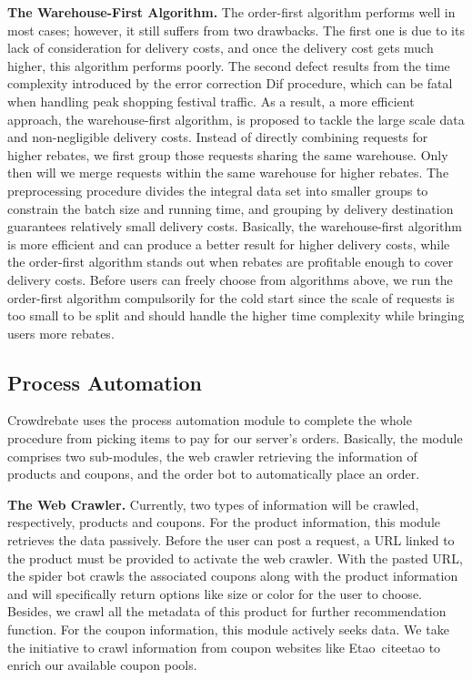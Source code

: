 \textbf{The Warehouse-First Algorithm.} The order-first algorithm performs well in most cases; however, it still suffers from two drawbacks. The first one is due to its lack of consideration for delivery costs, and once the delivery cost gets much higher, this algorithm performs poorly. The second defect results from the time complexity introduced by the error correction Dif procedure, which can be fatal when handling peak shopping festival traffic. As a result, a more efficient approach, the warehouse-first algorithm, is proposed to tackle the large scale data and non-negligible delivery costs. Instead of directly combining requests for higher rebates, we first group those requests sharing the same warehouse. Only then will we merge requests within the same warehouse for higher rebates. The preprocessing procedure divides the integral data set into smaller groups to constrain the batch size and running time, and grouping by delivery destination guarantees relatively small delivery costs. Basically, the warehouse-first algorithm is more efficient and can produce a better result for higher delivery costs, while the order-first algorithm stands out when rebates are profitable enough to cover delivery costs. Before users can freely choose from algorithms above, we run the order-first algorithm compulsorily for the cold start since the scale of requests is too small to be split and should handle the higher time complexity while bringing users more rebates.

\subsection{Process Automation}

Crowdrebate uses the process automation module to complete the whole procedure from picking items to pay for our server's orders. Basically, the module comprises two sub-modules, the web crawler retrieving the information of products and coupons, and the order bot to automatically place an order. 

\textbf{The Web Crawler.} Currently, two types of information will be crawled, respectively, products and coupons. For the product information, this module retrieves the data passively. Before the user can post a request, a URL linked to the product must be provided to activate the web crawler. With the pasted URL, the spider bot crawls the associated coupons along with the product information and will specifically return options like size or color for the user to choose. Besides, we crawl all the metadata of this product for further recommendation function. For the coupon information, this module actively seeks data. We take the initiative to crawl information from coupon websites like Etao~cite{etao} to enrich our available coupon pools. 

